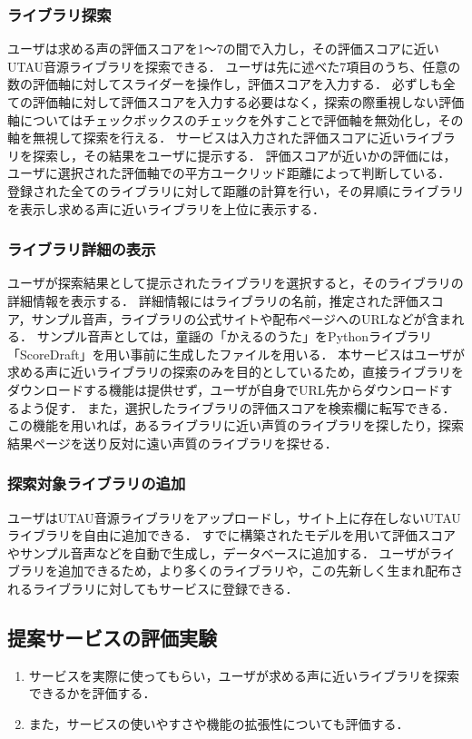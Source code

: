 \documentclass[a4j,8pt,twocolumn]{extarticle}
\begin{document}
\subsubsection{ライブラリ探索}
ユーザは求める声の評価スコアを1〜7の間で入力し，その評価スコアに近いUTAU音源ライブラリを探索できる．
ユーザは先に述べた7項目のうち、任意の数の評価軸に対してスライダーを操作し，評価スコアを入力する．
必ずしも全ての評価軸に対して評価スコアを入力する必要はなく，探索の際重視しない評価軸についてはチェックボックスのチェックを外すことで評価軸を無効化し，その軸を無視して探索を行える．
サービスは入力された評価スコアに近いライブラリを探索し，その結果をユーザに提示する．
評価スコアが近いかの評価には，ユーザに選択された評価軸での平方ユークリッド距離によって判断している．
登録された全てのライブラリに対して距離の計算を行い，その昇順にライブラリを表示し求める声に近いライブラリを上位に表示する．

\subsubsection{ライブラリ詳細の表示}
ユーザが探索結果として提示されたライブラリを選択すると，そのライブラリの詳細情報を表示する．
詳細情報にはライブラリの名前，推定された評価スコア，サンプル音声，ライブラリの公式サイトや配布ページへのURLなどが含まれる．
サンプル音声としては，童謡の「かえるのうた」をPythonライブラリ「ScoreDraft」を用い事前に生成したファイルを用いる．
本サービスはユーザが求める声に近いライブラリの探索のみを目的としているため，直接ライブラリをダウンロードする機能は提供せず，ユーザが自身でURL先からダウンロードするよう促す．
また，選択したライブラリの評価スコアを検索欄に転写できる．
この機能を用いれば，あるライブラリに近い声質のライブラリを探したり，探索結果ページを送り反対に遠い声質のライブラリを探せる．

\subsubsection{探索対象ライブラリの追加}
ユーザはUTAU音源ライブラリをアップロードし，サイト上に存在しないUTAUライブラリを自由に追加できる．
すでに構築されたモデルを用いて評価スコアやサンプル音声などを自動で生成し，データベースに追加する．
ユーザがライブラリを追加できるため，より多くのライブラリや，この先新しく生まれ配布されるライブラリに対してもサービスに登録できる．

\subsection{提案サービスの評価実験}
\begin{enumerate}
  \item サービスを実際に使ってもらい，ユーザが求める声に近いライブラリを探索できるかを評価する．
  \item また，サービスの使いやすさや機能の拡張性についても評価する．
\end{enumerate}
\end{document}
